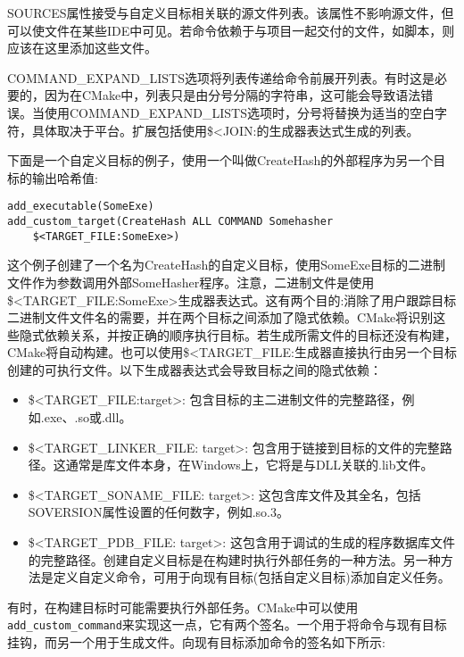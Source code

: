 SOURCES属性接受与自定义目标相关联的源文件列表。该属性不影响源文件，但可以使文件在某些IDE中可见。若命令依赖于与项目一起交付的文件，如脚本，则应该在这里添加这些文件。

COMMAND\_EXPAND\_LISTS选项将列表传递给命令前展开列表。有时这是必要的，因为在CMake中，列表只是由分号分隔的字符串，这可能会导致语法错误。当使用COMMAND\_EXPAND\_LISTS选项时，分号将替换为适当的空白字符，具体取决于平台。扩展包括使用\$<JOIN:的生成器表达式生成的列表。

下面是一个自定义目标的例子，使用一个叫做CreateHash的外部程序为另一个目标的输出哈希值:

\begin{lstlisting}[style=styleCMake]
add_executable(SomeExe)
add_custom_target(CreateHash ALL COMMAND Somehasher
	$<TARGET_FILE:SomeExe>)
\end{lstlisting}

这个例子创建了一个名为CreateHash的自定义目标，使用SomeExe目标的二进制文件作为参数调用外部SomeHasher程序。注意，二进制文件是使用\$<TARGET\_FILE:SomeExe>生成器表达式。这有两个目的:消除了用户跟踪目标二进制文件文件名的需要，并在两个目标之间添加了隐式依赖。CMake将识别这些隐式依赖关系，并按正确的顺序执行目标。若生成所需文件的目标还没有构建，CMake将自动构建。也可以使用\$<TARGET\_FILE:生成器直接执行由另一个目标创建的可执行文件。以下生成器表达式会导致目标之间的隐式依赖：

\begin{itemize}
\item 
\$<TARGET\_FILE:target>: 包含目标的主二进制文件的完整路径，例如.exe、.so或.dll。

\item 
\$<TARGET\_LINKER\_FILE: target>: 包含用于链接到目标的文件的完整路径。这通常是库文件本身，在Windows上，它将是与DLL关联的.lib文件。

\item 
\$<TARGET\_SONAME\_FILE: target>: 这包含库文件及其全名，包括SOVERSION属性设置的任何数字，例如.so.3。

\item
\$<TARGET\_PDB\_FILE: target>: 这包含用于调试的生成的程序数据库文件的完整路径。创建自定义目标是在构建时执行外部任务的一种方法。另一种方法是定义自定义命令，可用于向现有目标(包括自定义目标)添加自定义任务。
\end{itemize}


有时，在构建目标时可能需要执行外部任务。CMake中可以使用\texttt{add\_custom\_command}来实现这一点，它有两个签名。一个用于将命令与现有目标挂钩，而另一个用于生成文件。向现有目标添加命令的签名如下所示:

